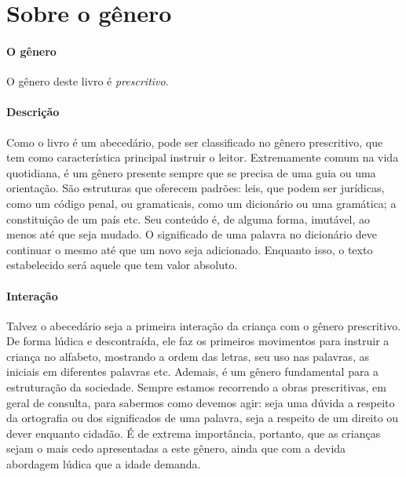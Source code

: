 \documentclass[11pt]{extarticle}
\begin{document}
\section{Sobre o gênero}

\paragraph{O gênero} O gênero deste livro é \textit{prescritivo}. 


\paragraph{Descrição} Como o livro é um abecedário, pode ser classificado no gênero prescritivo, que tem como característica principal instruir o leitor.
Extremamente comum na vida quotidiana, é um gênero presente
sempre que se precisa de uma guia ou uma orientação. São estruturas 
que oferecem padrões: leis, que podem ser jurídicas, como um código
penal, ou gramaticais, como um dicionário ou uma gramática; a constituição
de um país etc. Seu conteúdo é, de alguma forma, imutável, ao menos até que seja
mudado. O significado de uma palavra no dicionário deve continuar o mesmo
até que um novo seja adicionado. Enquanto isso, o texto
estabelecido será aquele que tem valor absoluto.

\paragraph{Interação} Talvez o abecedário seja a primeira interação da criança com o gênero prescritivo. De forma lúdica e descontraída, ele faz os primeiros movimentos para instruir a criança no alfabeto, mostrando a ordem das letras, seu uso nas palavras, as iniciais em diferentes palavras etc. Ademais, é um gênero fundamental para a estruturação da sociedade.
Sempre estamos recorrendo a obras prescritivas, em geral de consulta, para
sabermos como devemos agir: seja uma dúvida a respeito da ortografia ou 
dos significados de uma palavra, seja a respeito de um direito ou dever
enquanto cidadão. É de extrema importância, portanto, que as crianças
sejam o mais cedo apresentadas a este gênero, ainda que com a 
devida abordagem lúdica que a idade demanda.

\end{document}
